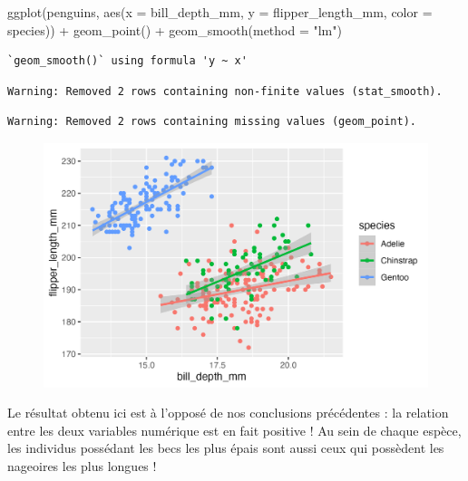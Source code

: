 \documentclass[
  letterpaper,
  DIV=11,
  numbers=noendperiod]{scrreprt}
\newenvironment{Shaded}{\begin{snugshade}}{\end{snugshade}}
\newcommand{\AttributeTok}[1]{\textcolor[rgb]{0.40,0.45,0.13}{#1}}
\newcommand{\FunctionTok}[1]{\textcolor[rgb]{0.28,0.35,0.67}{#1}}
\newcommand{\NormalTok}[1]{\textcolor[rgb]{0.00,0.23,0.31}{#1}}
\newcommand{\SpecialCharTok}[1]{\textcolor[rgb]{0.37,0.37,0.37}{#1}}
\newcommand{\StringTok}[1]{\textcolor[rgb]{0.13,0.47,0.30}{#1}}
\begin{document}
\begin{Shaded}
\begin{Highlighting}[]
\FunctionTok{ggplot}\NormalTok{(penguins, }\FunctionTok{aes}\NormalTok{(}\AttributeTok{x =}\NormalTok{ bill\_depth\_mm, }\AttributeTok{y =}\NormalTok{ flipper\_length\_mm,}
                     \AttributeTok{color =}\NormalTok{ species)) }\SpecialCharTok{+}
  \FunctionTok{geom\_point}\NormalTok{() }\SpecialCharTok{+}
  \FunctionTok{geom\_smooth}\NormalTok{(}\AttributeTok{method =} \StringTok{"lm"}\NormalTok{)}
\end{Highlighting}
\end{Shaded}

\begin{verbatim}
`geom_smooth()` using formula 'y ~ x'
\end{verbatim}

\begin{verbatim}
Warning: Removed 2 rows containing non-finite values (stat_smooth).
\end{verbatim}

\begin{verbatim}
Warning: Removed 2 rows containing missing values (geom_point).
\end{verbatim}

\begin{figure}[H]

{\centering \includegraphics{./03-visualization_files/figure-pdf/unnamed-chunk-83-1.png}

}

\end{figure}

Le résultat obtenu ici est à l'opposé de nos conclusions précédentes :
la relation entre les deux variables numérique est en fait positive ! Au
sein de chaque espèce, les individus possédant les becs les plus épais
sont aussi ceux qui possèdent les nageoires les plus longues !
\end{document}
